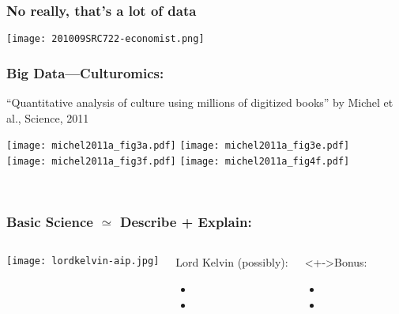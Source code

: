 \begin{frame}[plain]
  \frametitle{No really, that's a lot of data}

  \texttt{[image: 201009SRC722-economist.png]}
\end{frame}


\begin{frame}
  \frametitle{Big Data---Culturomics:}

  \small{``Quantitative analysis of culture using millions of
    digitized books'' by Michel et al., Science, 2011\cite{michel2011a}}

  \texttt{[image: michel2011a\_fig3a.pdf]} 
  \texttt{[image: michel2011a\_fig3e.pdf]} \\
  \texttt{[image: michel2011a\_fig3f.pdf]}
  \texttt{[image: michel2011a\_fig4f.pdf]}

  {\small
    \\
  }

\end{frame}


\begin{frame}
  \frametitle{Basic Science $\simeq$ Describe + Explain:}

  \begin{columns}
    \texttt{[image: lordkelvin-aip.jpg]}
    \begin{block}{Lord Kelvin (possibly):}
      \begin{itemize}
      \item<+->
      \item<+-> 
      \end{itemize}
    \end{block}
    \begin{block}<+->{Bonus:}
      \begin{itemize}
      \item<+->
      \item<+->
      \end{itemize}
    \end{block}

  \end{columns}

\end{frame}


